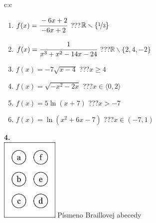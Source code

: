 \documentclass[10pt]{report}
\begin{document}
\begin{tabular}{c:c}
\begin{minipage}[c][104.5mm][t]{0.5\linewidth}
\begin{center}
\begin{minipage}{0.79\linewidth}
\begin{center}
\begin{varwidth}{\linewidth}
\begin{enumerate}
\normalsizerrr
\item $f(x)=\cfrac{-6x+2}{-6x+2}$\quad \dotfill\; ???\;\dotfill \quad $\mathbb{R}\smallsetminus\{\nicefrac{1}{3}\}$
\item $f(x)=\cfrac{1}{x^3+x^2-14x-24}$\quad \dotfill\; ???\;\dotfill \quad $\mathbb{R}\smallsetminus\{2,4,-2\}$
\item $f(x)=-7\sqrt{x-4}$\quad \dotfill\; ???\;\dotfill \quad $x\geq4$
\item $f(x)=\sqrt{-x^2-2x}$\quad \dotfill\; ???\;\dotfill \quad $x\in\langle0 , 2\rangle$
\item $f(x)=5\ln{(x+7)}$\quad \dotfill\; ???\;\dotfill \quad $x>-7$
\item $f(x)=\ln{(x^2+6x-7)}$\quad \dotfill\; ???\;\dotfill \quad $x\in(-7 , 1)$
\end{enumerate}
\end{varwidth}
\end{center}
\end{minipage}
\begin{minipage}{0.20\linewidth}
\begin{center}
{\Huge\bfseries 4.} \\[2mm]
\includegraphics[height=40mm]{../images/braille.png}
{\small Písmeno Braillovej abecedy}
\end{center}
\end{minipage}
\end{center}
\end{minipage}
%
\end{tabular}
\newpage
\thispagestyle{empty}
\end{document}

